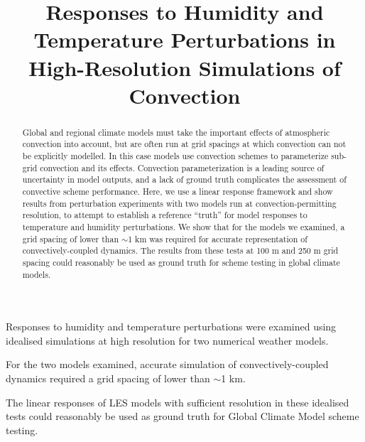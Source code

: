\documentclass[draft]{agujournal2019}
\begin{document}
\title{Responses to Humidity and Temperature Perturbations in High-Resolution Simulations of Convection}




\begin{keypoints}
    \item Responses to humidity and temperature perturbations were examined
    using idealised simulations at high resolution for two numerical weather
    models.
    \item For the two models examined, accurate simulation of
    convectively-coupled dynamics required a grid spacing of lower than $\sim$1
    km.
    \item The linear responses of LES models with sufficient resolution in these
    idealised tests could reasonably be used as ground truth for Global Climate
    Model scheme testing.
\end{keypoints}

\justifying

\begin{abstract}
Global and regional climate models must take the important effects of
atmospheric convection into account, but are often run at grid spacings at which
convection can not be explicitly modelled. In this case models use convection
schemes to parameterize sub-grid convection and its effects. Convection
parameterization is a leading source of uncertainty in model outputs, and a lack
of ground truth complicates the assessment of convective scheme performance.
Here, we use a linear response framework and show results from perturbation
experiments with two models run at convection-permitting resolution, to attempt
to establish a reference ``truth'' for model responses to temperature and
humidity perturbations. We show that for the models we examined, a grid spacing
of lower than $\sim$1 km was required for accurate representation of
convectively-coupled dynamics. The results from these tests at 100 m and 250 m
grid spacing could reasonably be used as ground truth for scheme testing in
global climate models.
\end{abstract}
\end{document}
